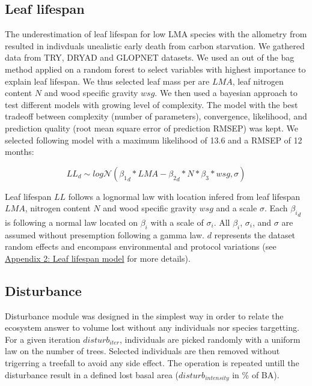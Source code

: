 \documentclass[12pt,]{article}
\theoremstyle{definition}
\theoremstyle{definition}
\theoremstyle{remark}
\begin{document}
\subsection{Leaf lifespan}\label{leaf-lifespan}

The underestimation of leaf lifespan for low LMA species with the
allometry from \citet{Reich1991a} resulted in indivduals unealistic
early death from carbon starvation. We gathered data from
TRY\citep{Kattge2011}, DRYAD \citep{chave_towards_2009} and GLOPNET
\citep{wright_worldwide_2004} datasets. We used an out of the bag method
applied on a random forest to select variables with highest importance
to explain leaf lifespan. We thus selected leaf mass per are \(LMA\),
leaf nitrogen content \(N\) and wood specific gravity \(wsg\). We then
used a bayesian approach to test different models with growing level of
complexity. The model with the best tradeoff between complexity (number
of parameters), convergence, likelihood, and prediction quality (root
mean square error of prediction RMSEP) was kept. We selected following
model with a maximum likelihood of 13.6 and a RMSEP of 12 months:

\begin{equation}
  LL_{d} \sim log\mathcal{N}({\beta_1}_d*LMA - {\beta_2}_d*N*\beta_3*wsg, \sigma)
  \label{eq:LL}
\end{equation}

Leaf lifespan \(LL\) follows a lognormal law with location infered from
leaf lifespan \(LMA\), nitrogen content \(N\) and wood specific gravity
\(wsg\) and a scale \(\sigma\). Each \({\beta_i}_d\) is following a
normal law located on \(\beta_i\) with a scale of \(\sigma_i\). All
\(\beta_i\), \(\sigma_i\), and \(\sigma\) are assumed without
presemption following a gamma law. \(d\) represents the dataset random
effects and encompass environmental and protocol variations (see
\protect\hyperlink{appendix-2-leaf-lifespan-model}{Appendix 2: Leaf
lifespan model} for more details).

\subsection{Disturbance}\label{disturbance}

Disturbance module was designed in the simplest way in order to relate
the ecosystem answer to volume lost without any individuals nor species
targetting. For a given iteration \(disturb_{iter}\), individuals are
picked randomly with a uniform law on the number of trees. Selected
individuals are then removed without trigerring a treefall to avoid any
side effect. The operation is repeated untill the disturbance result in
a defined lost basal area (\(disturb_{intensity}\) in \% of BA).
\end{document}
